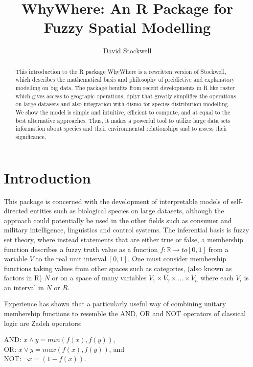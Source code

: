 \documentclass{article}
\title{WhyWhere: An R  Package for Fuzzy Spatial Modelling}
\author{David Stockwell \hspace{0.4cm} }
\date{}
\begin{document}



\maketitle

\begin{abstract}
This introduction to the R package WhyWhere is a rewritten
version of  Stockwell,  which
describes the mathematical basis and philosophy of preidictive and explanatory modelling on big data. The package benifits from recent developments in R like raster which gives access to geograpic operations, dplyr that greatly simplifies the operations on large datasets and also integration with dismo for species distribution modelling.  We show the model is simple and intuitive, efficient to compute, and at equal to the best alternative approaches.  Thus, it makes a powerful tool to utilize large data sets information about species and their environmental relationships and to assess their significance.
\end{abstract}

\section{Introduction} \label{sec:intro}

This package is concerned with the development of interpretable models of self-directed entities such as biological species on large datasets, although the approach could potentially be used in the other fields such as consumer and military intelligence, linguistics and control systems.  The inferential basis is fuzzy set theory, where instead statements that are either true or false, a membership function describes a fuzzy truth value as a function $f: \mathbb{R} \rightarrow to [0,1]$ from a variable $V$ to the real unit interval $[0,1]$.  One must consider membership functions taking values from other spaces such as categories, (also known as factors in R) $N$ or on a space of many variables $V_1 \times V_2 \times ... \times V_n$ where each $V_i$ is an interval in $N$ or $R$. 

Experience has shown that a particularly useful way of combining unitary membership functions to resemble the AND, OR and NOT operators of classical logic are Zadeh operators:

AND: $x \land y = min(f(x),f(y))$, \\
OR: $x \lor y = max(f(x),f(y))$, and \\
NOT: $ \lnot x = (1-f(x))$.  
\end{document}
